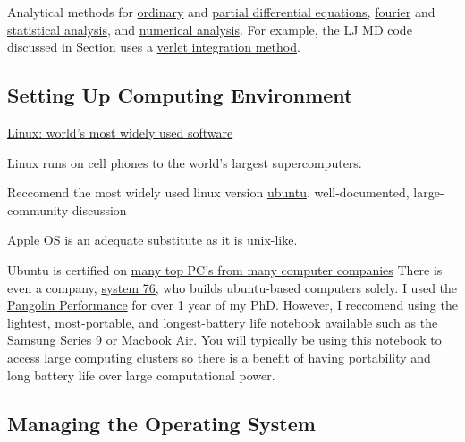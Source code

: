 Analytical methods for 
\href{http://en.wikipedia.org/wiki/Ordinary_differential_equations}
{ordinary} and 
\href{http://en.wikipedia.org/wiki/Partial_differential_equation}
{partial differential equations}, 
\href{http://en.wikipedia.org/wiki/Fourier_analysis}
{fourier} and 
\href{http://en.wikipedia.org/wiki/Statistics}
{statistical analysis},\cite{mcquarrie_mathematical_2003} 
and 
\href{http://en.wikipedia.org/wiki/Numerical_analysis}
{numerical analysis}.\cite{moin_fundamentals_2010} For example, 
the LJ MD code discussed in Section uses a  
\href{http://en.wikipedia.org/wiki/Verlet_integration}
{verlet integration method}. 

\subsection{Setting Up Computing Environment}

\href{http://www.youtube.com/watch?v=7XTHdcmjenI}
{Linux: world's most widely used software}

Linux runs on cell phones to the world's largest supercomputers. 

Reccomend the most widely used linux version 
\href{http://www.ubuntu.com/}{ubuntu}.
well-documented, large-community discussion

Apple OS is an adequate substitute as it is 
\href{https://en.wikipedia.org/wiki/Unix-like}{unix-like}.



Ubuntu is certified on 
\href{http://www.ubuntu.com/certification/}
{many top PC's from many computer companies}
There is even a company, \href{https://www.system76.com/}{system 76}, 
who builds ubuntu-based computers solely. I used the 
\href{https://www.system76.com/laptops/model/panp9}
{Pangolin Performance} for over 1 year of my PhD.  However, 
I reccomend using the lightest, most-portable, and longest-battery 
life notebook available such as the 
\href{https://help.ubuntu.com/community/SamsungSeries9}
{Samsung Series 9}  
or \href{https://help.ubuntu.com/community/MacBookAir}{Macbook Air}. 
You will typically be using this notebook to access large computing 
clusters so there is a benefit of having portability and long 
battery life over large computational power.    

\subsection{Managing the Operating System}


